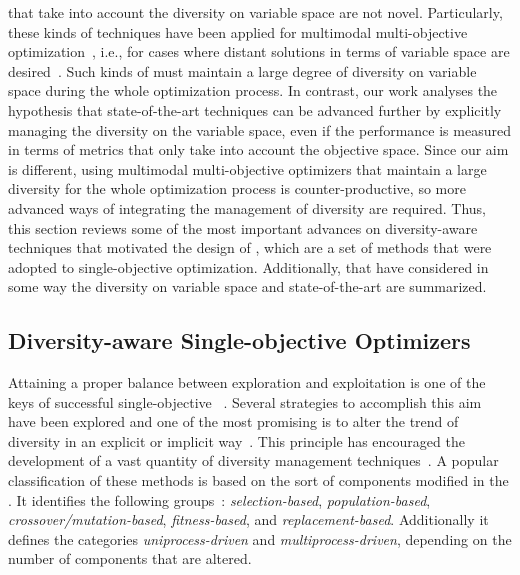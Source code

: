 \MOEAS{} that take into account the diversity on variable space are not novel.
%
Particularly, these kinds of techniques have been applied for multimodal multi-objective optimization~\cite{Liang:16},
i.e., for cases where distant solutions in terms of variable space are desired~\cite{deb2008omni, cuate2019variation}.
%
Such kinds of \MOEAS{} must maintain a large degree of diversity on variable space during the whole optimization process.
%
In contrast, our work analyses the hypothesis that state-of-the-art techniques can be advanced further by explicitly managing
the diversity on the variable space, even if the performance is measured in terms of metrics that only take into account 
the objective space.
%
Since our aim is different, using multimodal multi-objective optimizers that maintain a large diversity 
for the whole optimization process is counter-productive, 
so more advanced ways of integrating the management of diversity are required.
%
Thus, this section reviews some of the most important advances on diversity-aware techniques that motivated the
design of \AVSDMOEAD{}, which are a set of methods that were adopted to single-objective optimization.
%
Additionally, \MOEAS{} that have considered in some way the diversity on variable space and
state-of-the-art \MOEAS{} are summarized.

\subsection{Diversity-aware Single-objective Optimizers}

Attaining a proper balance between exploration and exploitation is one of the keys of successful single-objective
\EAS{}~\cite{lin2009auto}.
%
Several strategies to accomplish this aim have been explored and one of the most promising is to alter the trend
of diversity in an explicit or implicit way~\cite{Joel:Crepinsek}.
%
This principle has encouraged the development of a vast quantity of diversity management techniques~\cite{pandey2014comparative}.
%
A popular classification of these methods is based on the sort of components modified in the \EA{}.
%
It identifies the following groups~\cite{Joel:Crepinsek}: \textit{selection-based}, \textit{population-based}, \textit{crossover/mutation-based}, \textit{fitness-based}, and \textit{replacement-based}.
%
Additionally it defines the categories \textit{uniprocess-driven} and \textit{multiprocess-driven}, depending on the number
of components that are altered.

